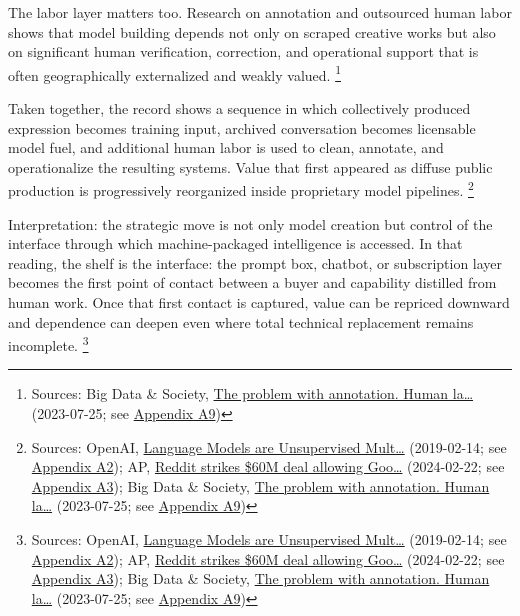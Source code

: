 \documentclass[
  american,
  11pt,
  letterpaper,
]{article}
\begin{document}
The labor layer matters too. Research on annotation and outsourced human
labor shows that model building depends not only on scraped creative
works but also on significant human verification, correction, and
operational support that is often geographically externalized and weakly
valued. \footnote{Sources: Big Data \& Society,
  \href{https://journals.sagepub.com/doi/10.1177/20539517231188723}{The
  problem with annotation. Human la\ldots{}} (2023-07-25; see
  \hyperref[appendix-a9-the-problem-with-annotation-human-labour-and-outsourcing-between-france-and-madagascar]{Appendix
  A9})}

Taken together, the record shows a sequence in which collectively
produced expression becomes training input, archived conversation
becomes licensable model fuel, and additional human labor is used to
clean, annotate, and operationalize the resulting systems. Value that
first appeared as diffuse public production is progressively reorganized
inside proprietary model pipelines. \footnote{Sources: OpenAI,
  \href{https://cdn.openai.com/better-language-models/language_models_are_unsupervised_multitask_learners.pdf}{Language
  Models are Unsupervised Mult\ldots{}} (2019-02-14; see
  \hyperref[appendix-a2-language-models-are-unsupervised-multitask-learners]{Appendix
  A2}); AP,
  \href{https://apnews.com/article/a7f131c7cb4225307134ef21d3c6a708}{Reddit
  strikes \$60M deal allowing Goo\ldots{}} (2024-02-22; see
  \hyperref[appendix-a3-reddit-strikes-60m-deal-allowing-google-to-train-ai-models-on-its-posts-unveils-ipo-plans]{Appendix
  A3}); Big Data \& Society,
  \href{https://journals.sagepub.com/doi/10.1177/20539517231188723}{The
  problem with annotation. Human la\ldots{}} (2023-07-25; see
  \hyperref[appendix-a9-the-problem-with-annotation-human-labour-and-outsourcing-between-france-and-madagascar]{Appendix
  A9})}

Interpretation: the strategic move is not only model creation but
control of the interface through which machine-packaged intelligence is
accessed. In that reading, the shelf is the interface: the prompt box,
chatbot, or subscription layer becomes the first point of contact
between a buyer and capability distilled from human work. Once that
first contact is captured, value can be repriced downward and dependence
can deepen even where total technical replacement remains incomplete.
\footnote{Sources: OpenAI,
  \href{https://cdn.openai.com/better-language-models/language_models_are_unsupervised_multitask_learners.pdf}{Language
  Models are Unsupervised Mult\ldots{}} (2019-02-14; see
  \hyperref[appendix-a2-language-models-are-unsupervised-multitask-learners]{Appendix
  A2}); AP,
  \href{https://apnews.com/article/a7f131c7cb4225307134ef21d3c6a708}{Reddit
  strikes \$60M deal allowing Goo\ldots{}} (2024-02-22; see
  \hyperref[appendix-a3-reddit-strikes-60m-deal-allowing-google-to-train-ai-models-on-its-posts-unveils-ipo-plans]{Appendix
  A3}); Big Data \& Society,
  \href{https://journals.sagepub.com/doi/10.1177/20539517231188723}{The
  problem with annotation. Human la\ldots{}} (2023-07-25; see
  \hyperref[appendix-a9-the-problem-with-annotation-human-labour-and-outsourcing-between-france-and-madagascar]{Appendix
  A9})}
\end{document}
